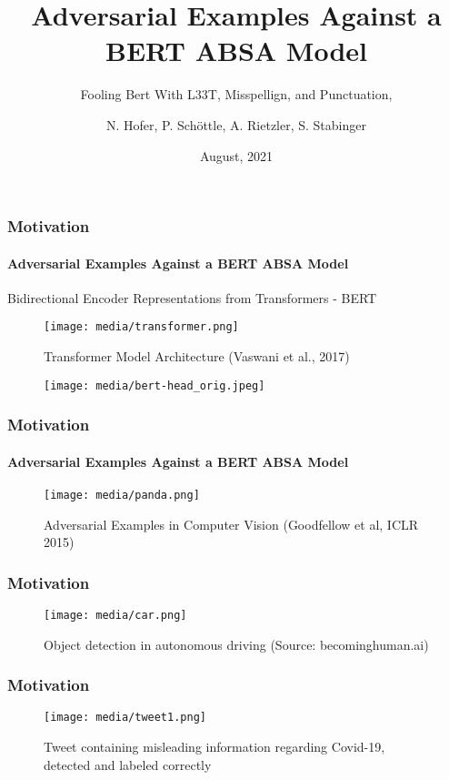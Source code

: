 \documentclass[aspectratio=1610,table,xcolor=dvipsnames]{beamer}
\title{Adversarial Examples Against a BERT ABSA Model}
\subtitle{Fooling Bert With L33T, Misspellign, and Punctuation,}
\author{N. Hofer, P. Schöttle, A. Rietzler, S. Stabinger}
\date{August, 2021}
\begin{document}
\begin{frame}
	\titlepage
\end{frame}



\begin{frame}
	\frametitle{Motivation}
	\framesubtitle{Adversarial Examples Against a \textbf{BERT} ABSA Model}
	Bidirectional Encoder Representations from Transformers - BERT
	\begin{figure}[H]
		\texttt{[image: media/transformer.png]}
		\caption{Transformer Model Architecture (Vaswani et al., 2017)}
	\end{figure}
	\begin{figure}[H]
		\texttt{[image: media/bert-head\_orig.jpeg]}
	\end{figure}

\end{frame}

\begin{frame}
	\frametitle{Motivation}
	\framesubtitle{\textbf{Adversarial Examples} Against a BERT ABSA Model}
	\begin{figure}[H]
		\centering
		\texttt{[image: media/panda.png]}
		\caption{Adversarial Examples in Computer Vision (Goodfellow et al, ICLR 2015)}
	\end{figure}

\end{frame}

\begin{frame}
	\frametitle{Motivation}
	\begin{figure}[H]
		\centering
		\texttt{[image: media/car.png]}
		\caption{Object detection in autonomous driving (Source: becominghuman.ai)}
	\end{figure}

\end{frame}

\begin{frame}
	\frametitle{Motivation}
	\begin{figure}[H]
		\centering
		\texttt{[image: media/tweet1.png]}
		\caption{Tweet containing misleading information regarding Covid-19, detected and labeled correctly}
	\end{figure}

\end{frame}
\end{document}
